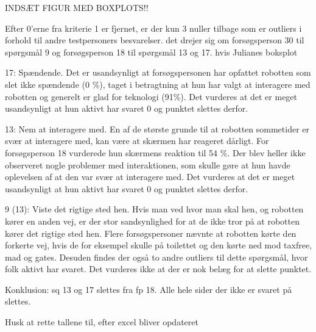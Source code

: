 INDSÆT FIGUR MED BOXPLOTS!!

Efter 0'erne fra kriterie 1 er fjernet, er der kun 3 nuller tilbage som er outliers i forhold til andre testpersoners besvarelser. det drejer sig om forsøgsperson 30 til spørgsmål 9 og forsøgsperson 18 til spørgsmål 13 og 17. 
hvis Julianes boksplot

17: Spændende. Det er usandsynligt at forsøgspersonen har opfattet robotten som slet ikke spændende (0 \%), taget i betragtning at hun har valgt at interagere med robotten og generelt er glad for teknologi (91\%). Det vurderes at det er meget usandsynligt at hun aktivt har svaret 0 og punktet slettes derfor.

13: Nem at interagere med. En af de største grunde til at robotten sommetider er svær at interagere med, kan være at skærmen har reageret dårligt. For forsøgsperson 18 vurderede hun skærmens reaktion til 54 \%. Der blev heller ikke observeret nogle problemer med interaktionen, som skulle gøre at hun havde oplevelsen af at den var svær at interagere med. Det vurderes at det er meget usandsynligt at hun aktivt har svaret 0 og punktet slettes derfor.

9 (13): Viste det rigtige sted hen. Hvis man ved hvor man skal hen, og robotten kører en anden vej, er der stor sandsynlighed for at de ikke tror på at robotten kører det rigtige sted hen. Flere forsøgspersoner nævnte at robotten kørte den forkerte vej, hvis de for eksempel skulle på toilettet og den kørte ned mod taxfree, mad og gates. Desuden findes der også to andre outliers til dette spørgsmål, hvor folk aktivt har svaret. Det vurderes ikke at der er nok belæg for at slette punktet.

Konklusion: sq 13 og 17 slettes fra fp 18. Alle hele sider der ikke er svaret på slettes. 

Husk at rette tallene til, efter excel bliver opdateret

